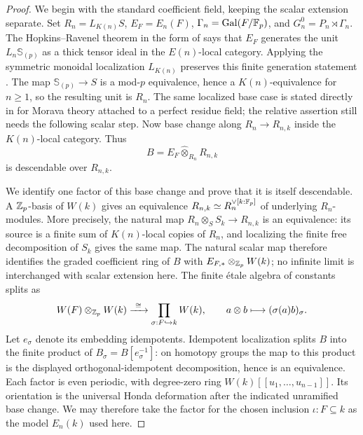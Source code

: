 \begin{proof}
We begin with the standard coefficient field, keeping the scalar
extension separate.  Set \(R_n=L_{K(n)}S\),
\(E_F=E_n(F)\), \(\Gamma_n=\operatorname{Gal}(F/\mathbb F_p)\), and
\(G_n^0=P_n\rtimes\Gamma_n\).  The Hopkins--Ravenel theorem in the
form of \cite[Theorem~4.18]{Mathew} says that \(E_F\) generates the unit
\(L_n\mathbb S_{(p)}\) as a thick tensor ideal in the \(E(n)\)-local
category.  Applying the symmetric monoidal localization \(L_{K(n)}\)
preserves this finite generation statement
\cite[Corollary~3.21]{Mathew}.  The map \(\mathbb S_{(p)}\to S\) is a
mod-\(p\) equivalence, hence a \(K(n)\)-equivalence for \(n\geq1\),
so the resulting unit is \(R_n\).  The same localized base case is
stated directly in \cite[Proposition~10.10]{Mathew} for Morava theory
attached to a perfect residue field; the relative assertion still needs
the following scalar step.  Now base change along
\(R_n\to R_{n,k}\) inside the \(K(n)\)-local category.  Thus
\[
 B=E_F\widehat\otimes_{R_n}R_{n,k}
\]
is descendable over \(R_{n,k}\).

We identify one factor of this base change and prove that it is
itself descendable.  A \(\mathbb Z_p\)-basis of \(W(k)\) gives an equivalence
\(R_{n,k}\simeq R_n^{\vee [k:\mathbb F_p]}\) of underlying \(R_n\)-modules.
More precisely, the natural map \(R_n\otimes_S S_k\to R_{n,k}\) is
an equivalence: its source is a finite sum of \(K(n)\)-local copies of
\(R_n\), and localizing the finite free decomposition of \(S_k\) gives
the same map.  The natural scalar map therefore identifies the graded coefficient
ring of \(B\) with \(E_{F,*}\otimes_{\mathbb Z_p}W(k)\); no infinite limit is
interchanged with scalar extension here.  The finite étale algebra
of constants splits as
\begin{equation}\label{h3:des:embedding-idempotents}
 W(F)\otimes_{\mathbb Z_p}W(k)
   \xrightarrow{\ \cong\ }
   \prod_{\sigma:F\hookrightarrow k}W(k),
 \qquad a\otimes b\longmapsto(\sigma(a)b)_\sigma.
\end{equation}
Let \(e_\sigma\) denote its embedding idempotents.  Idempotent
localization splits \(B\) into the finite product of
\(B_\sigma=B[e_\sigma^{-1}]\): on homotopy groups the map to this
product is the displayed orthogonal-idempotent decomposition, hence
is an equivalence.  Each factor is even periodic, with degree-zero
ring \(W(k)[[u_1,\ldots,u_{n-1}]]\).  Its orientation is the universal
Honda deformation after the indicated unramified base change.  We may
therefore take the factor for the chosen inclusion \(\iota:F\subseteq k\)
as the model \(E_n(k)\) used here.


\end{proof}

